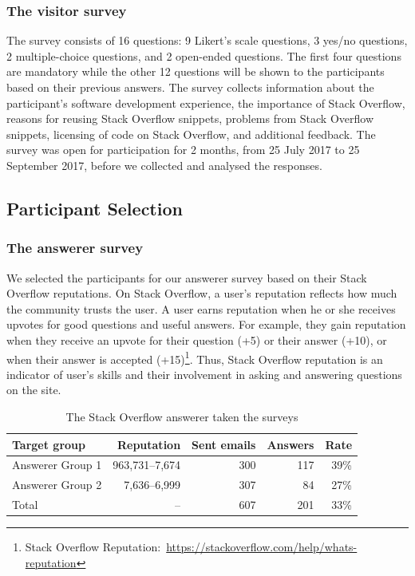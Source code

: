 \documentclass{svjour3}                     %
\begin{document}
\subsubsection{The visitor survey} 
The survey consists of 16 questions: 9 Likert's
scale questions, 3 yes/no questions, 2 multiple-choice questions, and 2
open-ended questions. The first four questions are mandatory while the other 12
questions will be shown to the participants based on their previous answers. The
survey collects information about the participant's software development
experience, the importance of Stack Overflow, reasons for reusing Stack Overflow
snippets, problems from Stack Overflow snippets, licensing of code on Stack
Overflow, and additional feedback. The survey was open for participation for 2 months, 
from 25 July 2017 to 25 September 2017, before we collected and analysed
the responses.

\subsection{Participant Selection}

\subsubsection{The answerer survey} 
We selected the participants for our answerer survey based on their Stack
Overflow reputations. On Stack Overflow, a user's reputation reflects how much
the community trusts the user. A user earns reputation when he or she receives
upvotes for good questions and useful answers. For example, they gain reputation when they receive an upvote for
their question (+5) or their answer (+10), or when their answer is accepted (+15)\footnote{Stack
	Overflow Reputation:~\url{https://stackoverflow.com/help/whats-reputation}}. Thus, Stack
Overflow reputation is an indicator of user's skills and their involvement in
asking and answering questions on the site.

\begin{table}
	\centering
	\caption{The Stack Overflow answerer taken the surveys}
	\label{tab:answerers}
	\begin{tabular}{lrrrr}
		\toprule
		Target group & Reputation & Sent emails & Answers & Rate \\
		\midrule
		Answerer Group 1 & 963,731--7,674 & 300 & 117 & 39\% \\
		Answerer Group 2 & 7,636--6,999 & 307 & 84 & 27\% \\
		\midrule
		Total & -- & 607 & 201 & 33\% \\
		\bottomrule
	\end{tabular}
\end{table}
\end{document}
